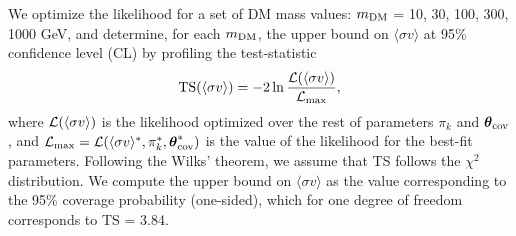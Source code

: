 \documentclass[12pt, a4paper]{article}
\newcommand{\be}{\begin{equation}}
\newcommand{\ee}{\end{equation}}
\newcommand{\btheta}{\boldsymbol{\theta}}
\newcommand{\sigmav}{\langle \sigma v \rangle}
\begin{document}
We optimize the likelihood for a set of DM mass values: $m_{\rm DM}$ = 10, 30, 100, 300, 1000 GeV, and determine, for each $m_{\rm DM}$, the upper bound on $\sigmav$ at 95\% confidence level (CL) by profiling the test-statistic 
\be
{\rm TS}(\sigmav) = -2\ln \frac{{\cal L}(\sigmav)}
{{\cal L}_{\rm max}}, 
\label{eq:TS}
\ee
where ${\cal L}(\sigmav)$ is the likelihood optimized over the rest of parameters $\pi_k$ and $\btheta_{\rm cov}$, and ${\cal L}_{\rm max}={\cal L}(\sigmav^*,\pi_k^*,\btheta_{\rm cov}^*)$ is the value of the likelihood for the best-fit parameters. 
Following the Wilks' theorem,
we assume that TS follows the $\chi^2$ distribution. %
We compute the upper bound on $\sigmav$ as the value corresponding to the 95\% coverage probability (one-sided), which for one degree of freedom corresponds to
TS = 3.84.

\end{document}
